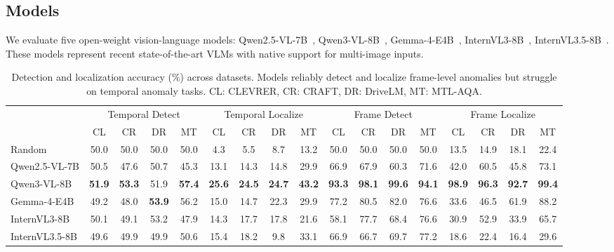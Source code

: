 \documentclass[11pt]{article}
\begin{document}
\subsection{Models}

We evaluate five open-weight vision-language models: Qwen2.5-VL-7B~\cite{bai2025qwen25vltechnicalreport}, Qwen3-VL-8B~\cite{bai2025qwen3vltechnicalreport}, Gemma-4-E4B~\cite{gemma4modelcard},  InternVL3-8B~\cite{zhu2025internvl3}, InternVL3.5-8B~\cite{wang2025internvl3}. These models represent recent state-of-the-art VLMs with native support for multi-image inputs.



\begin{table}[t!]
    \centering
    \setlength{\tabcolsep}{4pt}
    \small
    \begin{tabular}{l cccc cccc cccc cccc}
    \toprule
     & \multicolumn{4}{c}{Temporal Detect} & \multicolumn{4}{c}{Temporal Localize} & \multicolumn{4}{c}{Frame Detect} & \multicolumn{4}{c}{Frame Localize} \\
    \cmidrule(lr){2-5} \cmidrule(lr){6-9} \cmidrule(lr){10-13} \cmidrule(lr){14-17}
     & CL & CR & DR & MT & CL & CR & DR & MT & CL & CR & DR & MT & CL & CR & DR & MT \\
    \midrule
     Random & 50.0 & 50.0 & 50.0 & 50.0 & 4.3 & 5.5 & 8.7 & 13.2 & 50.0 & 50.0 & 50.0 & 50.0 & 13.5 & 14.9 & 18.1 & 22.4 \\
     \midrule
    Qwen2.5-VL-7B & 50.5 & 47.6 & 50.7 & 45.3 & 13.1 & 14.3 & 14.8 & 29.9 & 66.9 & 67.9 & 60.3 & 71.6 & 42.0 & 60.5 & 45.8 & 73.1 \\
    Qwen3-VL-8B & \textbf{51.9} & \textbf{53.3} & 51.9 & \textbf{57.4} & \textbf{25.6} & \textbf{24.5} & \textbf{24.7} & \textbf{43.2} & \textbf{93.3} & \textbf{98.1} & \textbf{99.6} & \textbf{94.1} & \textbf{98.9} & \textbf{96.3} & \textbf{92.7} & \textbf{99.4} \\
    Gemma-4-E4B & 49.2 & 48.0 & \textbf{53.9} & 56.2 & 15.0 & 14.7 & 22.3 & 29.9 & 77.2 & 80.5 & 82.0 & 76.6 & 33.6 & 46.5 & 61.9 & 88.2 \\
    InternVL3-8B & 50.1 & 49.1 & 53.2 & 47.9 & 14.3 & 17.7 & 17.8 & 21.6 & 58.1 & 77.7 & 68.4 & 76.6 & 30.9 & 52.9 & 33.9 & 65.7 \\
    InternVL3.5-8B & 49.6 & 49.9 & 49.9 & 50.6 & 15.4 & 18.2 & 9.8 & 33.1 & 66.9 & 66.7 & 69.7 & 77.2 & 18.6 & 22.4 & 16.4 & 29.6 \\
    \bottomrule
    \end{tabular}
    \caption{Detection and localization accuracy (\%) across datasets. Models reliably detect and localize frame-level anomalies but struggle on temporal anomaly tasks. CL: CLEVRER, CR: CRAFT, DR: DriveLM, MT: MTL-AQA.}
    \label{tab:detailed_results}
\end{table}
\end{document}
